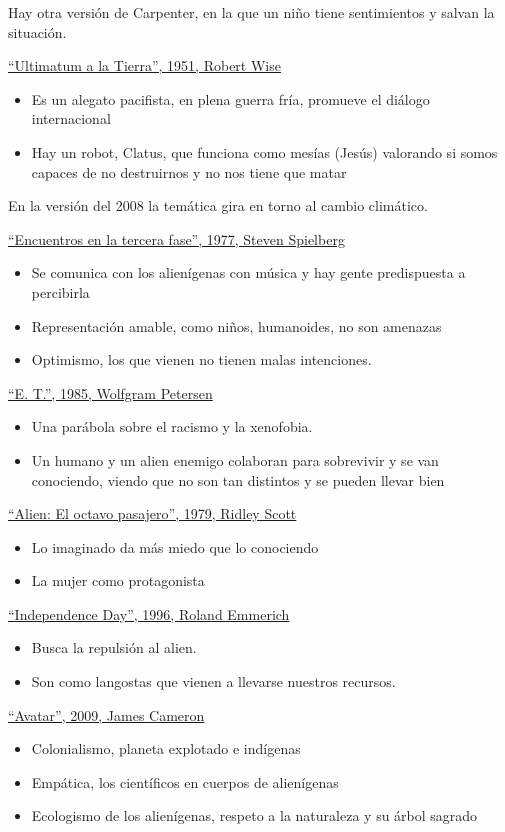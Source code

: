 \documentclass[12pt, twoside, openright]{report} %
\begin{document}
Hay otra versión de Carpenter, en la que un niño tiene sentimientos y salvan la situación.

\underline{\enquote{Ultimatum a la Tierra}, 1951, Robert Wise}
\begin{itemize}
	\item Es un alegato pacifista, en plena guerra fría, promueve el diálogo internacional
	\item Hay un robot, Clatus, que funciona como mesías (Jesús) valorando si somos capaces de no destruirnos y no nos tiene que matar
\end{itemize}


En la versión del 2008 la temática gira en torno al cambio climático.

\underline{\enquote{Encuentros en la tercera fase}, 1977, Steven Spielberg}
\begin{itemize}
	\item Se comunica con los alienígenas con música y hay gente predispuesta a percibirla
	\item Representación amable, como niños, humanoides, no son amenazas
	\item Optimismo, los que vienen no tienen malas intenciones.
\end{itemize}

\underline{\enquote{E. T.}, 1985, Wolfgram Petersen}
\begin{itemize}
	\item Una parábola sobre el racismo y la xenofobia.
	\item Un humano y un alien enemigo colaboran para sobrevivir y se van conociendo, viendo que no son tan distintos y se pueden llevar bien
\end{itemize}

\underline{\enquote{Alien: El octavo pasajero}, 1979, Ridley Scott}
\begin{itemize}
	\item Lo imaginado da más miedo que lo conociendo
	\item La mujer como protagonista
\end{itemize}

\underline{\enquote{Independence Day}, 1996, Roland Emmerich}
\begin{itemize}
	\item Busca la repulsión al alien.
	\item Son como langostas que vienen a llevarse nuestros recursos.
\end{itemize}

\underline{\enquote{Avatar}, 2009, James Cameron}
\begin{itemize}
	\item Colonialismo, planeta explotado e indígenas
	\item Empática, los científicos en cuerpos de alienígenas
	\item Ecologismo de los alienígenas, respeto a la naturaleza y su árbol sagrado
\end{itemize}
\end{document}

